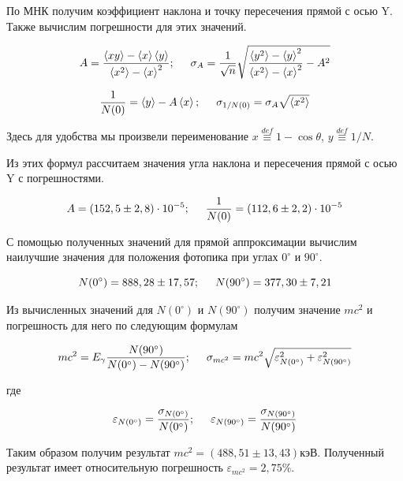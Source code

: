 \documentclass[12pt]{article}
\begin{document}
    По МНК получим коэффициент наклона и точку пересечения прямой с осью Y.
    Также вычислим погрешности для этих значений.

    $$
      A = \frac{\left<xy\right> - \left<x\right>\left<y\right>}{\left<x^2\right>
      - \left<x\right>^2}; \hspace{0.5cm} \sigma_A = \frac{1}{\sqrt{n}}
      \sqrt{\frac{\left<y^2\right> - \left<y\right>^2}{\left<x^2\right> -
      \left<x\right>^2} - A^2}
    $$

    $$
      \frac{1}{N(0)} = \left<y\right> - A \left<x\right>; \hspace{0.5cm}
      \sigma_{1/N(0)} = \sigma_A \sqrt{\left<x^2\right>}
    $$

    Здесь для удобства мы произвели переименование $x \stackrel{def}{\equiv}
    1 - \cos \theta$, $y \stackrel{def}{\equiv} 1 / N$.

    Из этих формул рассчитаем значения угла наклона и пересечения прямой с осью
    Y с погрешностями.

    $$
      A = (152,5 \pm 2,8) \cdot 10^{-5}; \hspace{0.5cm}
      \frac{1}{N(0)} = (112,6 \pm 2,2) \cdot 10^{-5}
    $$

    С помощью полученных значений для прямой аппроксимации вычислим наилучшие
    значения для положения фотопика при углах $0^{\circ}$ и $90^{\circ}$.

    $$
      N(0^{\circ}) = 888,28 \pm 17,57; \hspace{0.5cm}
      N(90^{\circ}) = 377,30 \pm 7,21
    $$

    Из вычисленных значений для $N(0^{\circ})$ и $N(90^{\circ})$ получим
    значение $mc^2$ и погрешность для него по следующим формулам

    $$
      mc^2 = E_{\gamma} \frac{N(90^{\circ})}{N(0^{\circ}) - N(90^{\circ})};
      \hspace{0.5cm}
      \sigma_{mc^2} = mc^2 \sqrt{\varepsilon_{N(0^{\circ})}^2 +
      \varepsilon_{N(90^{\circ})}^2}
    $$

    где

    $$
      \varepsilon_{N(0^{\circ})} = \frac{\sigma_{N(0^{\circ})}}{N(0^{\circ})};
      \hspace{0.5cm}
      \varepsilon_{N(90^{\circ})} = \frac{\sigma_{N(90^{\circ})}}{N(90^{\circ})}
    $$

    Таким образом получим результат $mc^2 = (488,51 \pm 13,43) кэВ$. Полученный
    результат имеет относительную погрешность $\varepsilon_{mc^2} = 2,75\%$.
\end{document}
